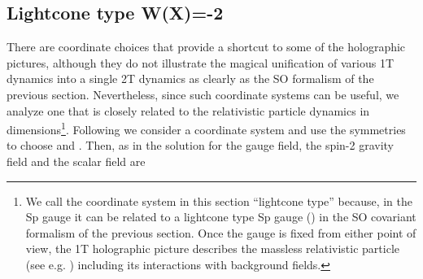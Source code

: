 \documentclass[a4paper,12pt]{article}
\begin{document}
\subsection{Lightcone type W(X)=-2\coordHE{}}

There are coordinate choices that provide a shortcut to some of the
holographic pictures, although they do not illustrate the magical
unification of various 1T dynamics into a single 2T dynamics as clearly as
the SO\coordHE{} formalism of the previous section. Nevertheless,
since such coordinate systems can be useful, we analyze one that is closely
related to the relativistic particle dynamics in \coordHE{} dimensions\footnote{%
We call the coordinate system in this section ``lightcone type'' because, in
the Sp\myHighlight{$\left( 2\right) $}\coordHE{} gauge \coordHE{} it can be related to a lightcone
type Sp\myHighlight{$\left( 2\right) $}\coordHE{} gauge (\coordHE{}) in the SO\coordHE{} covariant formalism of the previous section. Once the gauge is
fixed from either point of view, the 1T holographic picture describes the
massless relativistic particle (see e.g. \cite{survey2T}) including its
interactions with background fields.}. Following \cite{emgrav} we consider a
coordinate system \coordHE{} and use the
symmetries to choose \coordHE{} and \coordHE{}. Then, as
in \cite{emgrav} the solution for the gauge field, the spin-2 gravity field \coordHE{} and the scalar field \coordHE{} are
\end{document}
